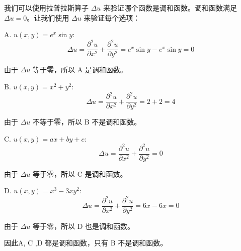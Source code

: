 \begin{questions}

\begin{solution}
   我们可以使用拉普拉斯算子 $\Delta u$ 来验证哪个函数是调和函数。调和函数满足 $\Delta u = 0$。让我们使用 $\Delta u$ 来验证每个选项：

A. $u(x, y) = e^x \sin y$:
$$\Delta u = \frac{\partial^2 u}{\partial x^2} + \frac{\partial^2 u}{\partial y^2} = e^x \sin y - e^x \sin y = 0$$

由于 $\Delta u$ 等于零，所以 A 是调和函数。

B. $u(x, y) = x^2 + y^2$:
$$\Delta u = \frac{\partial^2 u}{\partial x^2} + \frac{\partial^2 u}{\partial y^2} = 2 + 2 = 4$$

由于 $\Delta u$ 不等于零，所以 B 不是调和函数。

C. $u(x, y) = ax + by + c$:
$$\Delta u = \frac{\partial^2 u}{\partial x^2} + \frac{\partial^2 u}{\partial y^2} = 0$$

由于 $\Delta u$ 等于零，所以 C 是调和函数。

D. $u(x, y) = x^3 - 3xy^2$:
$$\Delta u = \frac{\partial^2 u}{\partial x^2} + \frac{\partial^2 u}{\partial y^2} = 6x - 6x = 0$$

由于 $\Delta u$ 等于零，所以 D 也是调和函数。

因此A, C ,D 都是调和函数，只有 B 不是调和函数。
\end{solution}
\end{questions}
